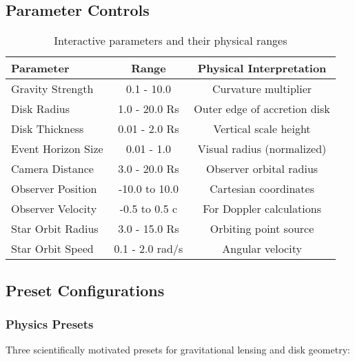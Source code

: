 \documentclass[12pt,a4paper]{article}
\theoremstyle{definition}
\theoremstyle{remark}
\begin{document}
\subsection{Parameter Controls}

\begin{table}[H]
\centering
\caption{Interactive parameters and their physical ranges}
\begin{tabular}{lcc}
\toprule
\textbf{Parameter} & \textbf{Range} & \textbf{Physical Interpretation} \\
\midrule
Gravity Strength & 0.1 - 10.0 & Curvature multiplier \\
Disk Radius & 1.0 - 20.0 Rs & Outer edge of accretion disk \\
Disk Thickness & 0.01 - 2.0 Rs & Vertical scale height \\
Event Horizon Size & 0.01 - 1.0 & Visual radius (normalized) \\
Camera Distance & 3.0 - 20.0 Rs & Observer orbital radius \\
Observer Position & -10.0 to 10.0 & Cartesian coordinates \\
Observer Velocity & -0.5 to 0.5 c & For Doppler calculations \\
Star Orbit Radius & 3.0 - 15.0 Rs & Orbiting point source \\
Star Orbit Speed & 0.1 - 2.0 rad/s & Angular velocity \\
\bottomrule
\end{tabular}
\label{tab:parameter_ranges}
\end{table}

\subsection{Preset Configurations}

\subsubsection{Physics Presets}

Three scientifically motivated presets for gravitational lensing and disk geometry:
\end{document}
